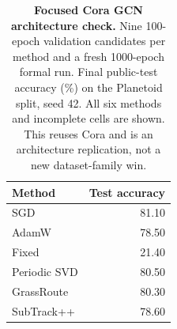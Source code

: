 \begin{table}[t]\centering\footnotesize
\caption{\textbf{Focused Cora GCN architecture check.} Nine 100-epoch
validation candidates per method and a fresh 1000-epoch formal run.
Final public-test accuracy (\%) on the Planetoid split, seed 42.
All six methods and incomplete cells are shown. This reuses Cora and
is an architecture replication, not a new dataset-family win.}
\label{tab:focused-gcn}
\setlength{\tabcolsep}{4pt}
\begin{tabular}{lr}\toprule Method & Test accuracy \\ \midrule
SGD & 81.10 \\
AdamW & 78.50 \\
Fixed & 21.40 \\
Periodic SVD & 80.50 \\
GrassRoute & \cellcolor{oursbg}80.30 \\
SubTrack++ & 78.60 \\
\bottomrule\end{tabular}\end{table}
